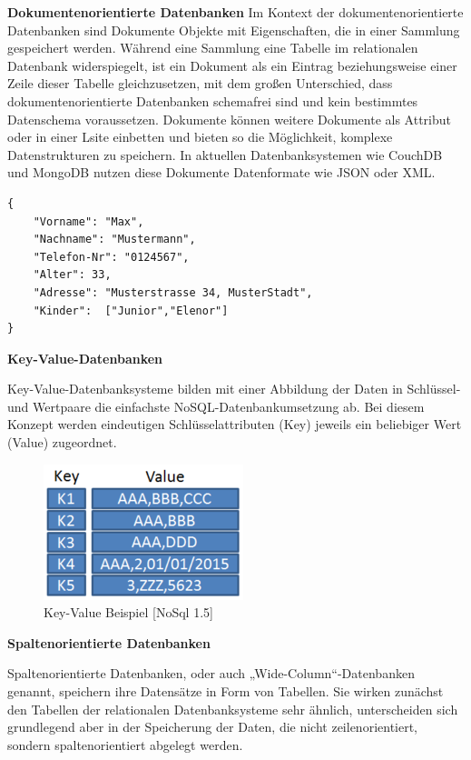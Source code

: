 \textbf{Dokumentenorientierte Datenbanken}
\newline
Im Kontext der dokumentenorientierte Datenbanken sind Dokumente Objekte mit Eigenschaften, die in einer Sammlung gespeichert werden. Während eine Sammlung eine Tabelle im relationalen Datenbank widerspiegelt, ist ein Dokument als ein Eintrag beziehungsweise einer Zeile dieser Tabelle gleichzusetzen, mit dem großen Unterschied, dass dokumentenorientierte Datenbanken schemafrei sind und kein bestimmtes Datenschema voraussetzen. Dokumente können weitere Dokumente als Attribut oder in einer Lsite einbetten und bieten so die Möglichkeit, komplexe Datenstrukturen zu speichern.  In aktuellen Datenbanksystemen wie CouchDB und MongoDB nutzen diese Dokumente Datenformate wie JSON oder XML. 

\begin{lstlisting}
{
	"Vorname": "Max",
	"Nachname": "Mustermann",
	"Telefon-Nr": "0124567",
	"Alter": 33,
	"Adresse": "Musterstrasse 34, MusterStadt",
	"Kinder":  ["Junior","Elenor"]
}
\end{lstlisting}


\textbf{Key-Value-Datenbanken}
\newline

Key-Value-Datenbanksysteme bilden mit einer Abbildung der Daten in Schlüssel- und Wertpaare die einfachste NoSQL-Datenbankumsetzung ab. Bei diesem Konzept werden eindeutigen Schlüsselattributen (Key) jeweils ein beliebiger Wert (Value) zugeordnet. 

\begin{figure}[h]
\centering
\includegraphics[]{images/KeyValue.PNG}
\caption{Key-Value Beispiel [NoSql 1.5]}
\end{figure}

\textbf{Spaltenorientierte Datenbanken}
\newline

Spaltenorientierte Datenbanken, oder auch „Wide-Column“-Datenbanken genannt, speichern ihre Datensätze in Form von Tabellen.  Sie wirken zunächst den Tabellen der relationalen Datenbanksysteme sehr ähnlich, unterscheiden sich grundlegend aber in der Speicherung der Daten, die nicht zeilenorientiert, sondern spaltenorientiert abgelegt werden. 
\newpage


